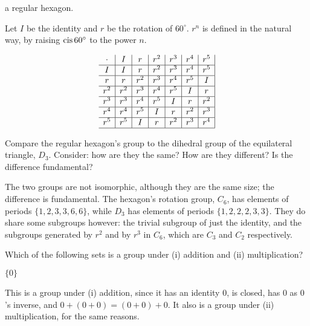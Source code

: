\documentclass[../key.tex]{subfiles}
\begin{document}
\begin{iinner_problem}
\item a regular hexagon.
\end{iinner_problem}

Let $I$ be the identity and $r$ be the rotation of $60^\circ$. $r^n$ is defined in the natural way, by raising $\operatorname{cis} 60^\circ$ to the power $n$.

$$\begin{array}{c|c|c|c|c|c|c|}
\cdot & I & r & r^2 & r^3 & r^4 & r^5 \\ \hline
I & I & r & r^2 & r^3 & r^4 & r^5 \\ \hline
r & r & r^2 & r^3 & r^4 & r^5 & I \\ \hline
r^2 & r^2 & r^3 & r^4 & r^5 & I & r \\ \hline
r^3 & r^3 & r^4 & r^5 & I & r & r^2 \\ \hline
r^4 & r^4 & r^5 & I & r & r^2 & r^3 \\ \hline
r^5 & r^5 & I & r & r^2 & r^3 & r^4 \\ \hline
\end{array}$$

\begin{inner_problem}
\item Compare the regular hexagon's group to the dihedral group of the equilateral triangle, $D_3$. Consider: how are they the same? How are they different? Is the difference fundamental?
\end{inner_problem}

The two groups are not isomorphic, although they are the same size; the difference is fundamental. The hexagon's rotation group, $C_6$, has elements of periods $\{1,2,3,3,6,6\}$, while $D_3$ has elements of periods $\{1,2,2,2,3,3\}$. They do share some subgroups however: the trivial subgroup of just the identity, and the subgroups generated by $r^2$ and by $r^3$ in $C_6$, which are $C_3$ and $C_2$ respectively.

\begin{outer_problem}
\item Which of the following sets is a group under (i) addition and (ii) multiplication?
\end{outer_problem}

\begin{inner_problem}[start=1]
\item $\{0\}$
\end{inner_problem}

This is a group under (i) addition, since it has an identity $0$, is closed, has $0$ as $0$'s inverse, and $0+(0+0)=(0+0)+0$. It also is a group under (ii) multiplication, for the same reasons.
\end{document}
